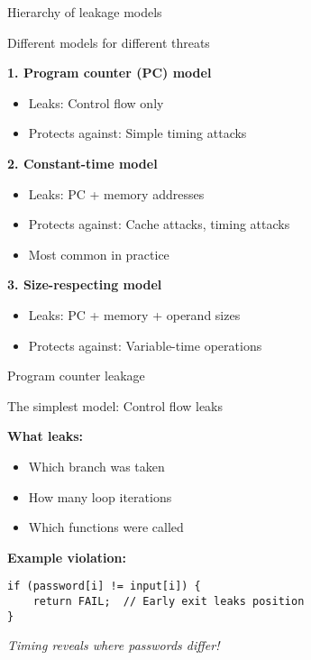 \documentclass[aspectratio=169, lualatex, handout]{beamer}
\begin{document}
\begin{frame}{Hierarchy of leakage models}
	\begin{center}
		\Large
		Different models for different threats
	\end{center}
	\vspace{1em}
	\textbf{1. Program counter (PC) model}
	\begin{itemize}
		\item Leaks: Control flow only
		\item Protects against: Simple timing attacks
	\end{itemize}
	\vspace{0.5em}
	\textbf{2. Constant-time model}
	\begin{itemize}
		\item Leaks: PC + memory addresses
		\item Protects against: Cache attacks, timing attacks
		\item Most common in practice
	\end{itemize}
	\vspace{0.5em}
	\textbf{3. Size-respecting model}
	\begin{itemize}
		\item Leaks: PC + memory + operand sizes
		\item Protects against: Variable-time operations
	\end{itemize}
\end{frame}

\begin{frame}{Program counter leakage}
	\begin{center}
		\Large
		The simplest model: Control flow leaks
	\end{center}
	\vspace{1em}
	\textbf{What leaks:}
	\begin{itemize}
		\item Which branch was taken
		\item How many loop iterations
		\item Which functions were called
	\end{itemize}
	\vspace{0.5em}
	\textbf{Example violation:}
	\begin{flushleft}
		\texttt{if (password[i] != input[i]) \{}\\
		\texttt{~~~~return FAIL;~~// Early exit leaks position}\\
		\texttt{\}}
	\end{flushleft}
	\vspace{0.5em}
	\begin{center}
		\textit{Timing reveals where passwords differ!}
	\end{center}
\end{frame}
\end{document}
